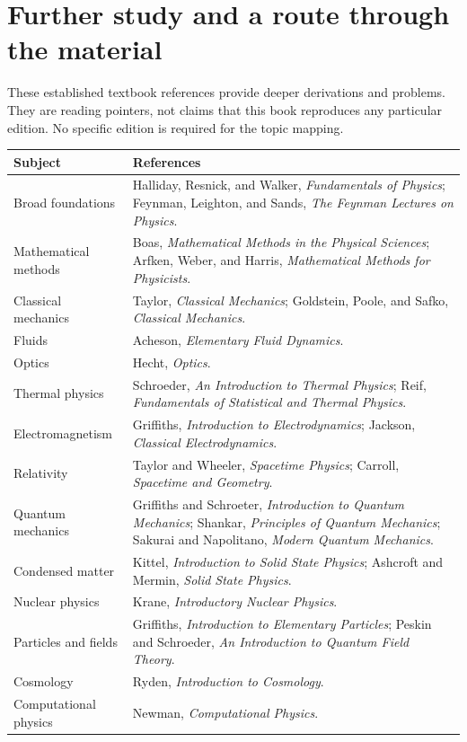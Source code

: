 \documentclass[11pt,oneside]{book}
\theoremstyle{reviewstyle}
\begin{document}
\chapter{Further study and a route through the material}
These established textbook references provide deeper derivations and problems. They are reading pointers, not claims that this book reproduces any particular edition. No specific edition is required for the topic mapping.
\begin{longtable}{p{}p{}}
\toprule
Subject & References\\
\midrule
\endhead
Broad foundations & Halliday, Resnick, and Walker, \emph{Fundamentals of Physics}; Feynman, Leighton, and Sands, \emph{The Feynman Lectures on Physics}.\\
Mathematical methods & Boas, \emph{Mathematical Methods in the Physical Sciences}; Arfken, Weber, and Harris, \emph{Mathematical Methods for Physicists}.\\
Classical mechanics & Taylor, \emph{Classical Mechanics}; Goldstein, Poole, and Safko, \emph{Classical Mechanics}.\\
Fluids & Acheson, \emph{Elementary Fluid Dynamics}.\\
Optics & Hecht, \emph{Optics}.\\
Thermal physics & Schroeder, \emph{An Introduction to Thermal Physics}; Reif, \emph{Fundamentals of Statistical and Thermal Physics}.\\
Electromagnetism & Griffiths, \emph{Introduction to Electrodynamics}; Jackson, \emph{Classical Electrodynamics}.\\
Relativity & Taylor and Wheeler, \emph{Spacetime Physics}; Carroll, \emph{Spacetime and Geometry}.\\
Quantum mechanics & Griffiths and Schroeter, \emph{Introduction to Quantum Mechanics}; Shankar, \emph{Principles of Quantum Mechanics}; Sakurai and Napolitano, \emph{Modern Quantum Mechanics}.\\
Condensed matter & Kittel, \emph{Introduction to Solid State Physics}; Ashcroft and Mermin, \emph{Solid State Physics}.\\
Nuclear physics & Krane, \emph{Introductory Nuclear Physics}.\\
Particles and fields & Griffiths, \emph{Introduction to Elementary Particles}; Peskin and Schroeder, \emph{An Introduction to Quantum Field Theory}.\\
Cosmology & Ryden, \emph{Introduction to Cosmology}.\\
Computational physics & Newman, \emph{Computational Physics}.\\
\bottomrule
\end{longtable}
\end{document}
